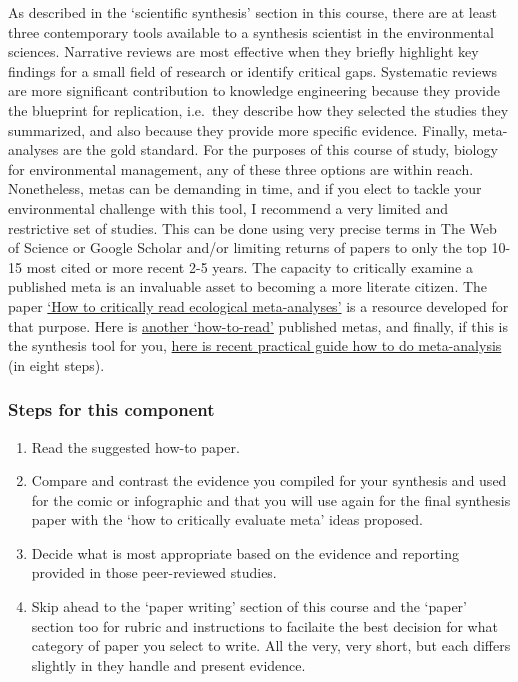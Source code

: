 \documentclass[
]{book}
\providecommand{\tightlist}{%
  \setlength{\itemsep}{0pt}\setlength{\parskip}{0pt}}
\begin{document}
As described in the `scientific synthesis' section in this course, there are at least three contemporary tools available to a synthesis scientist in the environmental sciences. Narrative reviews are most effective when they briefly highlight key findings for a small field of research or identify critical gaps. Systematic reviews are more significant contribution to knowledge engineering because they provide the blueprint for replication, i.e.~they describe how they selected the studies they summarized, and also because they provide more specific evidence. Finally, meta-analyses are the gold standard. For the purposes of this course of study, biology for environmental management, any of these three options are within reach. Nonetheless, metas can be demanding in time, and if you elect to tackle your environmental challenge with this tool, I recommend a very limited and restrictive set of studies. This can be done using very precise terms in The Web of Science or Google Scholar and/or limiting returns of papers to only the top 10-15 most cited or more recent 2-5 years. The capacity to critically examine a published meta is an invaluable asset to becoming a more literate citizen. The paper \href{https://onlinelibrary.wiley.com/doi/10.1002/jrsm.1150}{`How to critically read ecological meta-analyses'}\citep{RN3498} is a resource developed for that purpose. Here is \href{https://onlinelibrary.wiley.com/doi/10.1002/jrsm.1109}{another `how-to-read'} published metas, and finally, if this is the synthesis tool for you, \href{https://link.springer.com/article/10.1007/s11301-021-00247-4}{here is recent practical guide how to do meta-analysis} (in eight steps).

\hypertarget{steps-for-this-component}{%
\subsubsection*{Steps for this component}\label{steps-for-this-component}}

\begin{enumerate}
\def\labelenumi{\arabic{enumi}.}
\tightlist
\item
  Read the suggested how-to paper.\\
\item
  Compare and contrast the evidence you compiled for your synthesis and used for the comic or infographic and that you will use again for the final synthesis paper with the `how to critically evaluate meta' ideas proposed.\\
\item
  Decide what is most appropriate based on the evidence and reporting provided in those peer-reviewed studies.\\
\item
  Skip ahead to the `paper writing' section of this course and the `paper' section too for rubric and instructions to facilaite the best decision for what category of paper you select to write. All the very, very short, but each differs slightly in they handle and present evidence.
\end{enumerate}
\end{document}
